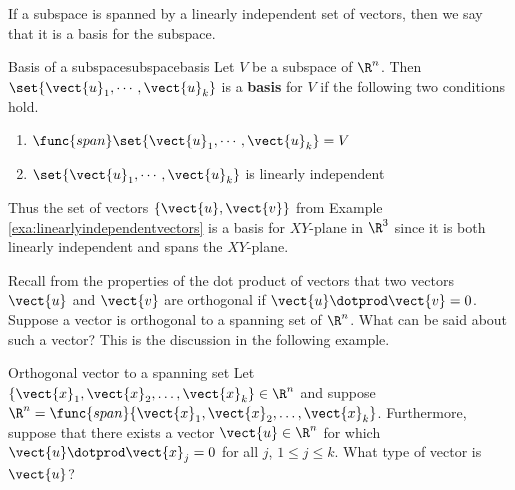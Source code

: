 If a subspace is spanned by a linearly independent set of vectors,
then we say that it is a basis for the subspace.

\begin{definition}{Basis of a subspace}{subspacebasis}
Let $V$ be a subspace of $\R^{n}$. Then $\set{
\vect{u}_{1},\cdots ,\vect{u}_{k}} $ is a \textbf{basis} for
$V$ if the following two conditions
hold.

\begin{enumerate}
\item $\func{span}\set{\vect{u}_{1},\cdots ,\vect{u}_{k}} =V$
\item $\set{\vect{u}_{1},\cdots ,\vect{u}_{k}} $ is linearly
independent
\end{enumerate}
\end{definition}

Thus the set of vectors $\{\vect{u}, \vect{v}\}$ from Example
\ref{exa:linearlyindependentvectors} is a basis for $XY$-plane in
$\R^{3}$ since it is both linearly independent and spans
the $XY$-plane.

 Recall from the properties of the dot product of vectors 
that two vectors $\vect{u}$ and $\vect{v}$ are orthogonal if $\vect{u}
\dotprod \vect{v} = 0$. Suppose a vector is orthogonal to a spanning set of $\R^n$. What can be said about such a vector? This is the discussion in the following example.

\begin{example}{Orthogonal vector to a spanning set}{}
Let $\{\vect{x}_1, \vect{x}_2, \ldots, \vect{x}_k\}\in\R^n$ and
suppose $\R^n=\func{span}\{\vect{x}_1, \vect{x}_2, \ldots, \vect{x}_k\}$.
Furthermore, suppose that there exists a vector $\vect{u}\in\R^n$ for which $\vect{u}\dotprod \vect{x}_j=0$ for all $j$, $1\leq j\leq k$.
What type of vector is $\vect{u}$?
\end{example}

